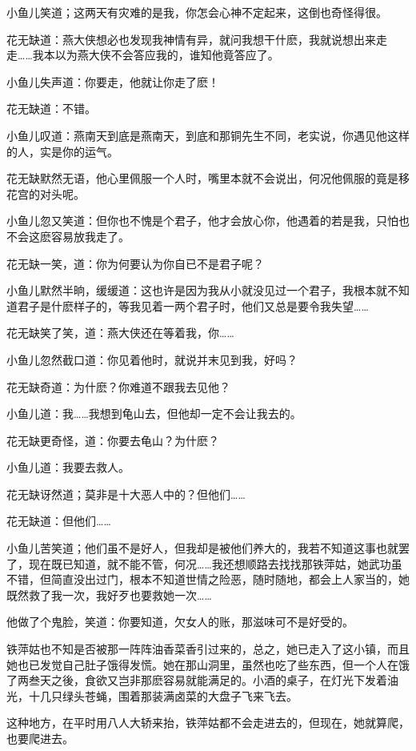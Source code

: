 \documentclass[12pt,oneside]{book}
\begin{document}
小鱼儿笑道；这两天有灾难的是我，你怎会心神不定起来，这倒也奇怪得很。

花无缺道：燕大侠想必也发现我神情有异，就问我想干什麽，我就说想出来走走\ldots\ldots 我本以为燕大侠不会答应我的，谁知他竟答应了。

小鱼儿失声道：你要走，他就让你走了麽！

花无缺道：不错。

小鱼儿叹道：燕南天到底是燕南天，到底和那铜先生不同，老实说，你遇见他这样的人，实是你的运气。

花无缺默然无语，他心里佩服一个人时，嘴里本就不会说出，何况他佩服的竟是移花宫的对头呢。

小鱼儿忽又笑道：但你也不愧是个君子，他才会放心你，他遇着的若是我，只怕也不会这麽容易放我走了。

花无缺一笑，道：你为何要认为你自已不是君子呢？

小鱼儿默然半晌，缓缓道：这也许是因为我从小就没见过一个君子，我根本就不知道君子是什麽样子的，等我见着一两个君子时，他们又总是要令我失望\ldots\ldots{}

花无缺笑了笑，道：燕大侠还在等着我，你\ldots\ldots{}

小鱼儿忽然截口道：你见着他时，就说并末见到我，好吗？

花无缺奇道：为什麽？你难道不跟我去见他？

小鱼儿道：我\ldots\ldots 我想到龟山去，但他却一定不会让我去的。

花无缺更奇怪，道：你要去龟山？为什麽？

小鱼儿道：我要去救人。

花无缺讶然道；莫非是十大恶人中的？但他们\ldots\ldots{}

花无缺道：但他们\ldots\ldots{}

小鱼儿苦笑道；他们虽不是好人，但我却是被他们养大的，我若不知道这事也就罢了，现在既已知道，就不能不管，何况\ldots\ldots 我还想顺路去找找那铁萍姑，她武功虽不错，但简直没出过门，根本不知道世情之险恶，随时随地，都会上人家当的，她既然救了我一次，我好歹也要救她一次\ldots\ldots{}

他做了个鬼脸，笑道：你要知道，欠女人的账，那滋味可不是好受的。

铁萍姑也不知是否被那一阵阵油香菜香引过来的，总之，她已走入了这小镇，而且她也已发觉自己肚子饿得发慌。她在那山洞里，虽然也吃了些东西，但一个人在饿了两叁天之後，食欲又岂非那麽容易就能满足的。小酒的桌子，在灯光下发着油光，十几只绿头苍蝇，围着那装满卤菜的大盘子飞来飞去。

这种地方，在平时用八人大轿来抬，铁萍姑都不会走进去的，但现在，她就算爬，也要爬进去。
\end{document}
